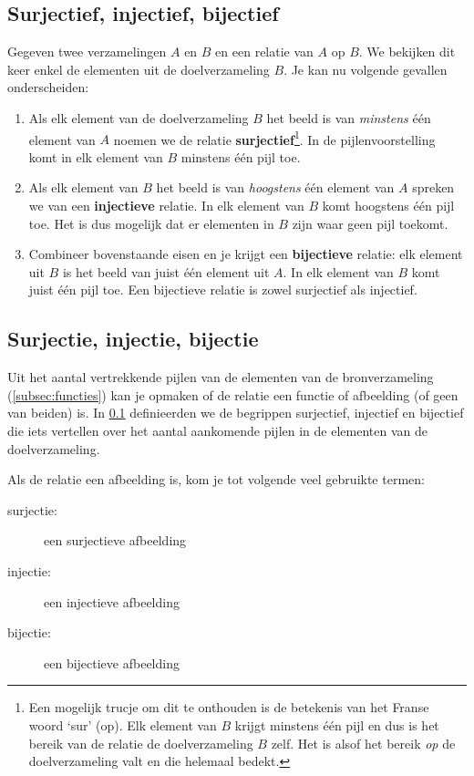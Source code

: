 \subsection{Surjectief, injectief, bijectief} \label{subsec:jectief}
Gegeven twee verzamelingen $A$ en $B$ en een relatie van $A$ op $B$. We bekijken dit keer enkel de elementen uit de doelverzameling $B$. Je kan nu volgende gevallen onderscheiden:
\begin{enumerate}
  \item Als elk element van de doelverzameling $B$ het beeld is van \emph{minstens} één element van $A$ noemen we de relatie \textbf{surjectief}\footnote{Een mogelijk trucje om dit te onthouden is de betekenis van het Franse woord `sur' (op). Elk element van $B$ krijgt minstens één pijl en dus is het bereik van de relatie de doelverzameling $B$ zelf. Het is alsof het bereik \emph{op} de doelverzameling valt en die helemaal bedekt.}. In de pijlenvoorstelling komt in elk element van $B$ minstens één pijl toe.
  \item Als elk element van $B$ het beeld is van \emph{hoogstens} één element van $A$ spreken we van een \textbf{injectieve} relatie. In elk element van $B$ komt hoogstens één pijl toe. Het is dus mogelijk dat er elementen in $B$ zijn waar geen pijl toekomt.
  \item Combineer bovenstaande eisen en je krijgt een \textbf{bijectieve} relatie: elk element uit $B$ is het beeld van juist één element uit $A$. In elk element van $B$ komt juist één pijl toe. Een bijectieve relatie is zowel surjectief als injectief.
\end{enumerate}

\subsection{Surjectie, injectie, bijectie}
Uit het aantal vertrekkende pijlen van de elementen van de bronverzameling (\cref{subsec:functies}) kan je opmaken of de relatie een functie of afbeelding (of geen van beiden) is. In \cref{subsec:jectief} definieerden we de begrippen surjectief, injectief en bijectief die iets vertellen over het aantal aankomende pijlen in de elementen van de doelverzameling.

Als de relatie een afbeelding is, kom je tot volgende veel gebruikte termen:
\begin{description}
\item[surjectie:] een surjectieve afbeelding
\item[injectie:] een injectieve afbeelding
\item[bijectie:] een bijectieve afbeelding
\end{description}


